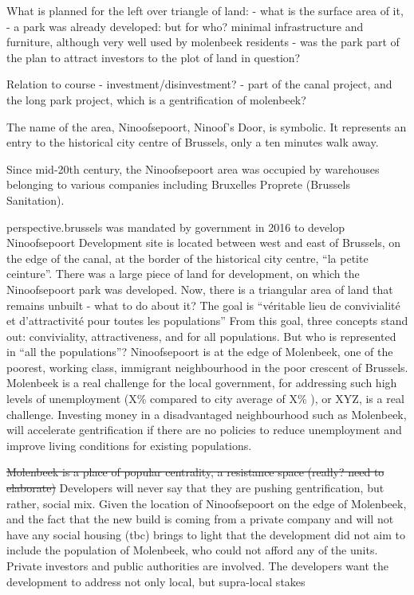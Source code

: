 \documentclass{article}[11pt]
\begin{document}
What is planned for the left over triangle of land:
- what is the surface area of it, 
- a park was already developed: but for who? minimal infrastructure and furniture, although very well used by molenbeek residents
- was the park part of the plan to attract investors to the plot of land in question?

Relation to course
- investment/disinvestment?
- part of the canal project, and the long park project, which is a gentrification of molenbeek? 



The name of the area, Ninoofsepoort, Ninoof's Door, is symbolic. It represents an entry to the historical city centre of Brussels, only a ten minutes walk away. 

Since mid-20th century, the Ninoofsepoort area was occupied by warehouses belonging to various companies including Bruxelles Proprete (Brussels Sanitation).

perspective.brussels was mandated by government in 2016 to develop Ninoofsepoort
Development site is located between west and east of Brussels, on the edge of the canal, at the border of the historical city centre, ``la petite ceinture''.
There was a large piece of land for development, on which the Ninoofsepoort park was developed. 
Now, there is a triangular area of land that remains unbuilt - what to do about it? The goal is ``véritable lieu de convivialité et d’attractivité pour toutes les populations'' \cite{perspectiveNinove}
From this goal, three concepts stand out: conviviality, attractiveness, and for all populations. But who is represented in ``all the populations''? Ninoofsepoort is at the edge of Molenbeek, one of the poorest, working class, immigrant neighbourhood in the poor crescent of Brussels. Molenbeek is a real challenge for the local government, for addressing such high levels of unemployment (X\% compared to city average of X\% \parencite{monitoring2020quartier}), or XYZ, is a real challenge. 
Investing money in a disadvantaged neighbourhood such as Molenbeek, will accelerate gentrification if there are no policies to reduce unemployment and improve living conditions for existing populations.

\sout{Molenbeek is a place of popular centrality, a resistance space (really? need to elaborate)}
Developers will never say that they are pushing gentrification, but rather, social mix. Given the location of Ninoofsepoort on the edge of Molenbeek, and the fact that the new build is coming from a private company and will not have any social housing (tbc) brings to light that the development did not aim to include the population of Molenbeek, who could not afford any of the units. 
Private investors and public authorities are involved.
The developers want the development to address not only local, but supra-local stakes
\end{document}
